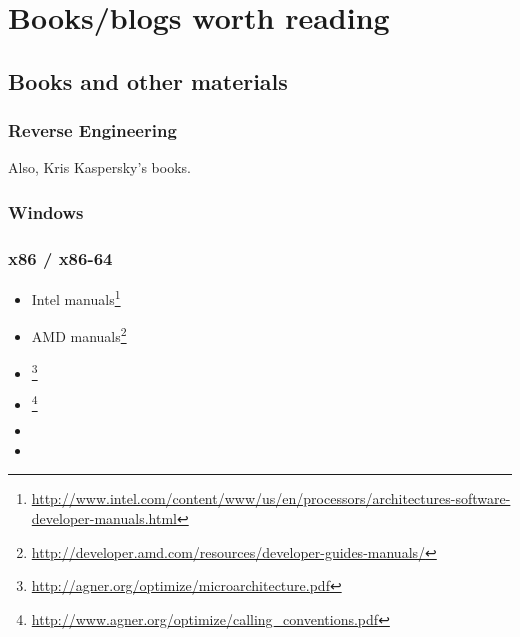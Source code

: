\chapter{Books/blogs worth reading}

\section{Books and other materials}

\subsection{Reverse Engineering}



Also, Kris Kaspersky's books.

\subsection{Windows}



\subsection{\CCpp}



\subsection{x86 / x86-64}

\label{x86_manuals}
\begin{itemize}
\item Intel manuals\footnote{\AlsoAvailableAs \url{http://www.intel.com/content/www/us/en/processors/architectures-software-developer-manuals.html}}

\item AMD manuals\footnote{\AlsoAvailableAs \url{http://developer.amd.com/resources/developer-guides-manuals/}}

\item \AgnerFog{}\footnote{\AlsoAvailableAs \url{http://agner.org/optimize/microarchitecture.pdf}}

\item \AgnerFogCC{}\footnote{\AlsoAvailableAs \url{http://www.agner.org/optimize/calling_conventions.pdf}}

\item \IntelOptimization

\item \AMDOptimization
\end{itemize}

